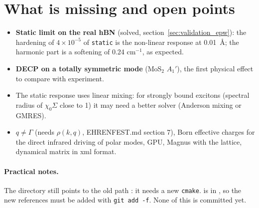 \documentclass[11pt]{article}
\begin{document}
\section{What is missing and open points}
\begin{itemize}
\item \textbf{Static limit on the real hBN} (solved, section~\ref{sec:validation_epw}): the hardening of $4\times10^{-5}$
  of \texttt{static} is the non-linear response at 0.01~\AA; the harmonic part is a softening of 0.24 cm$^{-1}$, as
  expected.
\item \textbf{DECP on a totally symmetric mode} (MoS$_2$ $A_1'$), the first physical effect to compare with experiment.
\item The static response uses linear mixing: for strongly bound excitons (spectral radius of $\chi_0\Sigma$ close to 1)
  it may need a better solver (Anderson mixing or GMRES).
\item $q\neq\Gamma$ (needs $\rho(k,q)$, EHRENFEST.md section 7), Born effective charges for the direct infrared driving
  of polar modes, GPU, Magnus with the lattice, dynamical matrix in xml format.
\end{itemize}

\paragraph{Practical notes.} The directory  still points to the old path : it needs a new
\texttt{cmake}.  is in , so the new references must be added with
\texttt{git add -f}. None of this is committed yet.
\end{document}

